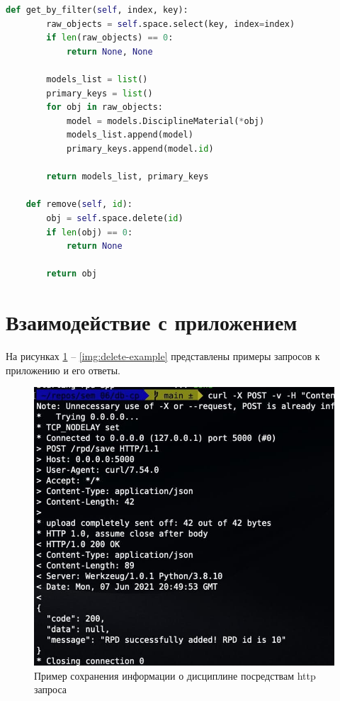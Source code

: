 \begin{lstlisting}[label=lst:db-tarantool, caption=Листинг модуля взаимодействия с СУБД Tarantool, language=python]
	def get_by_filter(self, index, key):
		raw_objects = self.space.select(key, index=index)
		if len(raw_objects) == 0:
			return None, None

		models_list = list()
		primary_keys = list()
		for obj in raw_objects:
			model = models.DisciplineMaterial(*obj)
			models_list.append(model)
			primary_keys.append(model.id)

		return models_list, primary_keys

	def remove(self, id):
		obj = self.space.delete(id)
		if len(obj) == 0:
			return None

		return obj
\end{lstlisting}


\section{Взаимодействие с приложением}

На рисунках \ref{img:save-example} -- \ref{img:delete-example} представлены примеры запросов к приложению и его ответы.

\begin{figure}[h!]
	\begin{center}
		\includegraphics[scale=0.8]{img/save_example.jpg}
	\end{center}
	\captionsetup{justification=centering}
	\caption{Пример сохранения информации о дисциплине посредствам http запроса}
	\label{img:save-example}
\end{figure}

